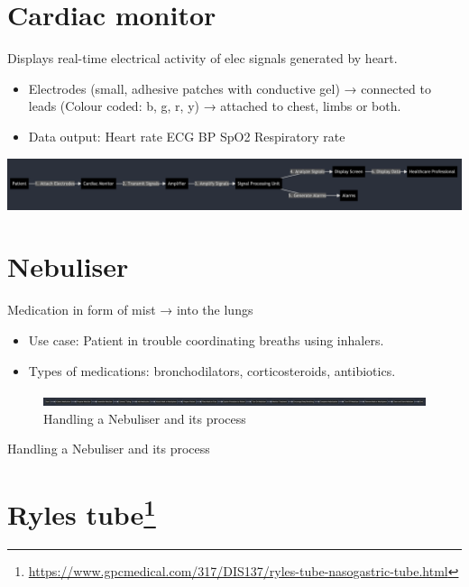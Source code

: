 \documentclass[
  11pt,
  letterpaper,
  DIV=11,
  numbers=noendperiod]{scrreprt}
\providecommand{\tightlist}{%
  \setlength{\itemsep}{0pt}\setlength{\parskip}{0pt}}\usepackage{longtable,booktabs,array}
\DeclareRobustCommand{\href}[2]{#2\footnote{\url{#1}}}
\begin{document}
\section{Cardiac monitor}\label{cardiac-monitor}

Displays real-time electrical activity of elec signals generated by
heart.

\begin{itemize}
\tightlist
\item
  Electrodes (small, adhesive patches with conductive gel) → connected
  to leads (Colour coded: b, g, r, y) → attached to chest, limbs or
  both.
\item
  Data output: Heart rate \textbar{} ECG \textbar{} BP \textbar{} SpO2
  \textbar{} Respiratory rate
\end{itemize}

\includegraphics{Beyond the Sterile Walls e0cff5645ec24545a8c247940fff8e84/Untitled 2.png}

\section{Nebuliser}\label{nebuliser}

Medication in form of mist → into the lungs

\begin{itemize}
\tightlist
\item
  Use case: Patient in trouble coordinating breaths using inhalers.
\item
  Types of medications: bronchodilators, corticosteroids, antibiotics.
\end{itemize}

\begin{figure}[H]

{\centering \includegraphics{Beyond the Sterile Walls e0cff5645ec24545a8c247940fff8e84/Untitled 3.png}

}

\caption{Handling a Nebuliser and its process}

\end{figure}%

Handling a Nebuliser and its process

\section{\texorpdfstring{\href{https://www.gpcmedical.com/317/DIS137/ryles-tube-nasogastric-tube.html}{Ryles
tube}}{Ryles tube}}\label{ryles-tube}
\end{document}
